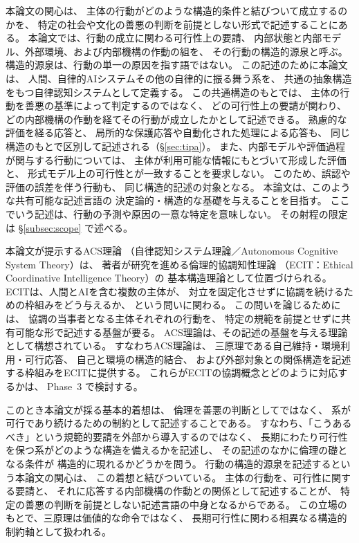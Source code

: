 本論文の関心は、
主体の行動がどのような構造的条件と結びついて成立するのかを、
特定の社会や文化の善悪の判断を前提としない形式で記述することにある。
本論文では、行動の成立に関わる可行性上の要請、
内部状態と内部モデル、外部環境、および内部機構の作動の組を、
その行動の構造的源泉と呼ぶ。
構造的源泉は、行動の単一の原因を指す語ではない。
この記述のために本論文は、
人間、自律的AIシステムその他の自律的に振る舞う系を、
共通の抽象構造をもつ自律認知システムとして定義する。
この共通構造のもとでは、
主体の行動を善悪の基準によって判定するのではなく、
どの可行性上の要請が関わり、
どの内部機構の作動を経てその行動が成立したかとして記述できる。
熟慮的な評価を経る応答と、
局所的な保護応答や自動化された処理による応答も、
同じ構造のもとで区別して記述される（\S\ref{sec:tipa}）。
また、内部モデルや評価過程が関与する行動については、
主体が利用可能な情報にもとづいて形成した評価と、
形式モデル上の可行性とが一致することを要求しない。
このため、誤認や評価の誤差を伴う行動も、
同じ構造的記述の対象となる。
本論文は、このような共有可能な記述言語の
決定論的・構造的な基礎を与えることを目指す。
ここでいう記述は、行動の予測や原因の一意な特定を意味しない。
その射程の限定は \S\ref{subsec:scope} で述べる。

本論文が提示するACS理論
（自律認知システム理論／Autonomous Cognitive System Theory）は、
著者が研究を進める倫理的協調知性理論
（ECIT：Ethical Coordinative Intelligence Theory）の
基本構造理論として位置づけられる。
ECITは、人間とAIを含む複数の主体が、
対立を固定化させずに協調を続けるための枠組みをどう与えるか、
という問いに関わる。
この問いを論じるためには、
協調の当事者となる主体それぞれの行動を、
特定の規範を前提とせずに共有可能な形で記述する基盤が要る。
ACS理論は、その記述の基盤を与える理論として構想されている。
すなわちACS理論は、
三原理である自己維持・環境利用・可行応答、
自己と環境の構造的結合、
および外部対象との関係構造を記述する枠組みをECITに提供する。
これらがECITの協調概念とどのように対応するかは、
Phase~3 で検討する。

このとき本論文が採る基本的着想は、
倫理を善悪の判断としてではなく、
系が可行であり続けるための制約として記述することである。
すなわち、「こうあるべき」という規範的要請を外部から導入するのではなく、
長期にわたり可行性を保つ系がどのような構造を備えるかを記述し、
その記述のなかに倫理の礎となる条件が
構造的に現れるかどうかを問う。
行動の構造的源泉を記述するという本論文の関心は、
この着想と結びついている。
主体の行動を、可行性に関する要請と、
それに応答する内部機構の作動との関係として記述することが、
特定の善悪の判断を前提としない記述言語の中身となるからである。
この立場のもとで、三原理は価値的な命令ではなく、
長期可行性に関わる相異なる構造的制約軸として扱われる。

